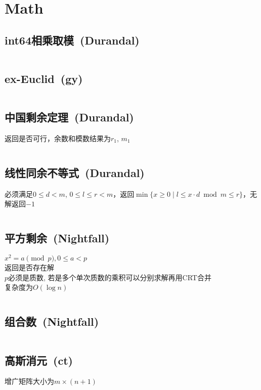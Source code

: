 \chapter{Math}
\section{int64相乘取模\ \small(Durandal)}
	\inputminted{cpp}{Math/int64_multiply_mod.cpp}
\section{ex-Euclid\ \small(gy)}
	\inputminted{cpp}{Math/extend_gcd.cpp}
\section{中国剩余定理\ \small(Durandal)}
	返回是否可行，余数和模数结果为$ r_1 $, $ m_1 $
	\inputminted{cpp}{Math/chinese_remainder_theorem.cpp}
\section{线性同余不等式\ \small(Durandal)}
	必须满足$ 0 \leq d < m $, $ 0 \leq l \leq r < m $，返回$ \min\lbrace x \geq 0 \mid l \leq x \cdot d \bmod m \leq r \rbrace $，无解返回$ -1 $ 
	\inputminted{cpp}{Math/linear_congruence_inequality.cpp}
\section{平方剩余\ \small(Nightfall)}
	$ x^2 = a \pmod p, 0 \leq a < p $
	\\返回是否存在解
	\\$ p $必须是质数, 若是多个单次质数的乘积可以分别求解再用CRT合并
	\\复杂度为$ O(\log n) $
	\inputminted{cpp}{Math/square_remainder.cpp}
\section{组合数\ \small(Nightfall)}
	\inputminted{cpp}{Math/ex_lucas.cpp}
\section{高斯消元\ \small(ct)}
	增广矩阵大小为$ m \times (n + 1) $
	\inputminted{cpp}{Math/gauss_elimination.cpp}
